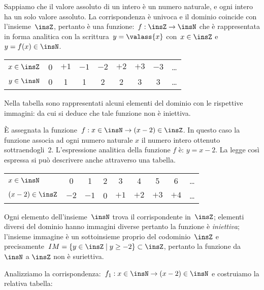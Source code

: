 \begin{exrig}
\begin{esempio}
Sappiamo che il valore assoluto di un intero è un numero naturale, e
ogni intero ha un solo valore assoluto. La corrispondenza è univoca e
il dominio coincide con l'insieme~$\insZ$, pertanto è una
funzione:~$f: \insZ\rightarrow\insN$ che è rappresentata in forma
analitica con la scrittura~${y=\valass{x}}$ con~$x\in\insZ$ e~$y=f(x)\in\insN$.

\begin{center}
\begin{tabular}{l*8{c}}
 \toprule
$x\in \insZ$ & 0 & $+1$ & $-1$ & $-2$ & $+2$ & $+3$ & $-3$ & \ldots\\
$y\in \insN$ & 0 & 1 & 1 & 2 & 2 & 3 & 3 & \ldots \\
\bottomrule
\end{tabular}
\end{center}
Nella tabella sono rappresentati alcuni elementi del dominio
con le rispettive immagini: da cui si deduce che tale funzione non è
iniettiva.
 \end{esempio}

 \begin{esempio}
 \label{ex:8.6}
È assegnata la funzione~$f:x\in \insN\rightarrow (x-2)\in\insZ$. In questo caso la funzione associa ad ogni numero naturale $x$ il
numero intero ottenuto sottraendogli~2. L'espressione analitica della funzione $f$ è: $y = x-2$. La legge così espressa si può descrivere anche attraverso una
tabella.

\begin{center}
\begin{tabular}{l*8{c}}
 \toprule
$x\in \insN$ & 0 & 1 & 2 & 3 & 4 & 5 & 6 & \ldots \\
$(x-2)\in \insZ$ & $-2$ & $-1$ & 0 & $+1$ & $+2$ & $+3$ & $+4$ & \ldots \\
\bottomrule
\end{tabular}
\end{center}

Ogni elemento dell'insieme~$\insN$ trova il corrispondente in~$\insZ$; elementi diversi del dominio hanno immagini diverse pertanto la
funzione è \emph{iniettiva}; l'insieme immagine è un sottoinsieme proprio del codominio~$\insZ$ e precisamente~$IM =\{y\in\insZ\mid y\ge -2\} \subset \insZ$,
pertanto la funzione da $\insN$ a $\insZ$ non è suriettiva.
 \end{esempio}

 \begin{esempio}
 \label{ex:8.7}
 Analizziamo la corrispondenza:~$f_{1}:x\in \insN\rightarrow (x-2)\in \insN$ e costruiamo la relativa tabella:


\end{esempio}
\end{exrig}
